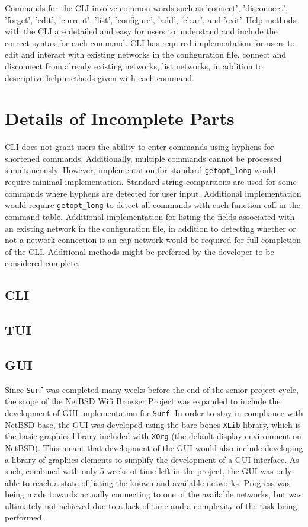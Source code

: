 \documentclass[11pt]{article}
\begin{document}
Commands for the CLI involve common words such as 'connect', 'disconnect', 'forget', 'edit', 
'current', 'list', 'configure', 'add', 'clear', and 'exit'. Help methods with the CLI are 
detailed and easy for users to understand and include the correct syntax for each command. 
CLI has required implementation for users to edit and interact with existing networks in the 
configuration file, connect and disconnect from already existing networks, list networks, in 
addition to descriptive help methods given with each command. 

\section*{Details of Incomplete Parts}
CLI does not grant users the ability to enter commands using hyphens for shortened commands. 
Additionally, multiple commands cannot be processed simultaneously. However, implementation for 
standard \texttt{getopt\_long} would require minimal implementation. Standard string comparsions 
are used for some commands where hyphens are detected for user input. Additional implementation 
would require \texttt{getopt\_long} to detect all commands with each function call in the command 
table. Additional implementation for listing the fields associated with an existing network in the 
configuration file, in addition to detecting whether or not a network connection is an eap network 
would be required for full completion of the CLI. Additional methods might be preferred by the 
developer to be considered complete. 
\subsection*{CLI}

\subsection*{TUI}

\subsection*{GUI}
Since \texttt{Surf} was completed many weeks before the end of the senior project cycle,
the scope of the NetBSD Wifi Browser Project was expanded to include the development of 
GUI implementation for \texttt{Surf}.
In order to stay in compliance with NetBSD-base, the GUI was developed using the bare bones
\texttt{XLib} library, which is the basic graphics library included with \texttt{XOrg} 
(the default display environment on NetBSD).
This meant that development of the GUI would also include developing a library of graphics
elements to simplify the development of a GUI interface.
As such, combined with only 5 weeks of time left in the project, the GUI was only able
to reach a state of listing the known and available networks.
Progress was being made towards actually connecting to one of the available networks,
but was ultimately not achieved due to a lack of time and a complexity of the task
being performed.
\end{document}

